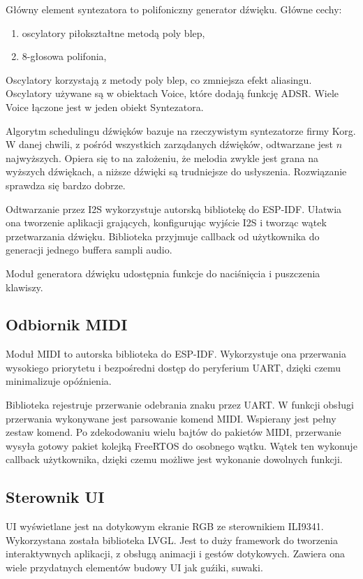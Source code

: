 \documentclass[12pt,a4paper,openright,dvipsnames]{mwart}
\begin{document}
Główny element syntezatora to polifoniczny generator dźwięku.
Główne cechy:
\begin{enumerate}
    \item oscylatory piłokształtne metodą poly blep,
    \item 8-głosowa polifonia,
\end{enumerate}

Oscylatory korzystają z metody poly blep,
co zmniejsza efekt aliasingu.
Oscylatory używane są w obiektach Voice,
które dodają funkcję ADSR.
Wiele Voice łączone jest w jeden obiekt
Syntezatora.

Algorytm schedulingu dźwięków bazuje na
rzeczywistym syntezatorze firmy Korg.
W danej chwili, z pośród wszystkich zarządanych dźwięków,
odtwarzane jest $n$ najwyższych.
Opiera się to na założeniu, że melodia zwykle jest grana
na wyższych dźwiękach, a niższe dźwięki są trudniejsze
do usłyszenia.
Rozwiązanie sprawdza się bardzo dobrze.

Odtwarzanie przez I2S wykorzystuje autorską
bibliotekę do ESP-IDF.
Ułatwia ona tworzenie aplikacji grających,
konfigurując wyjście I2S i
tworząc wątek przetwarzania dźwięku.
Biblioteka przyjmuje callback od użytkownika
do generacji jednego buffera sampli audio.

Moduł generatora dźwięku udostępnia funkcje
do naciśnięcia i puszczenia klawiszy.



\subsection{Odbiornik MIDI}

Moduł MIDI to autorska biblioteka do ESP-IDF.
Wykorzystuje ona przerwania wysokiego priorytetu
i bezpośredni dostęp do peryferium UART,
dzięki czemu minimalizuje opóźnienia.

Biblioteka rejestruje przerwanie odebrania znaku przez UART.
W funkcji obsługi przerwania wykonywane jest parsowanie
komend MIDI. Wspierany jest pełny zestaw komend.
Po zdekodowaniu wielu bajtów do pakietów MIDI,
przerwanie wysyła gotowy pakiet kolejką FreeRTOS
do osobnego wątku. Wątek ten wykonuje callback użytkownika,
dzięki czemu możliwe jest wykonanie dowolnych funkcji.


\subsection{Sterownik UI}

UI wyświetlane jest na dotykowym ekranie RGB
ze sterownikiem ILI9341.
Wykorzystana została biblioteka LVGL.
Jest to duży framework do tworzenia interaktywnych aplikacji,
z obsługą animacji i gestów dotykowych. Zawiera ona
wiele przydatnych elementów budowy UI jak guźiki, suwaki.
\end{document}
